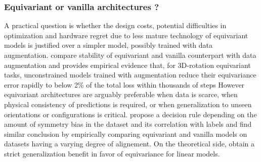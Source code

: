 \documentclass[mathematics,review,submit,moreauthors]{Definitions/mdpi}
\begin{document}

\subsubsection{Equivariant or vanilla architectures ?}
A practical question is whether the design costs, potential difficulties in optimization and hardware regret due to less mature technology of equivariant models is justified over a simpler model, possibly trained with data augmentation.
\cite{nordenfors2024} compare stability of equivariant and vanilla counterpart with data augmentation and \cite{shen2026} provides empirical evidence that, for 3D-rotation equivariant tasks, unconstrained models trained with augmentation reduce their equivariance error rapidly to below 2\% of the total loss within thousands of steps
However equivariant architectures are arguably preferable when data is scarce, when physical consistency of predictions is required, or when generalization to unseen orientations or configurations is critical.
\citet{lawrence2026} propose a decision rule depending on the amount of symmetry bias in the dataset and its correlation with labels and \citet{rygiel2026} find similar conclusion by empirically comparing equivariant and vanilla models on datasets having a varying degree of alignement.
On the theoretical side, \cite{elesedy2021p3icml} obtain a strict generalization benefit in favor of equivariance for linear models.
\end{document}
